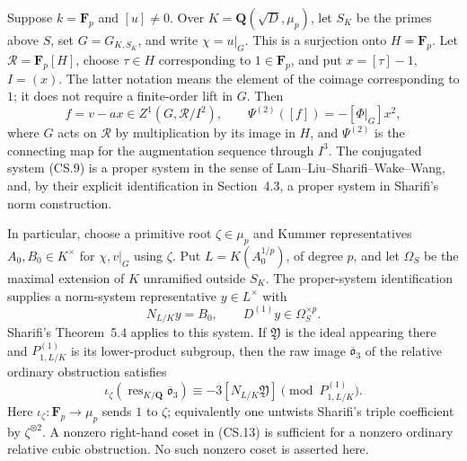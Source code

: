 \begin{corollary}
Suppose \(k=\mathbf F_p\) and \([u]\ne0\).
Over \(K=\mathbf Q(\sqrt D,\mu_p)\), let \(S_K\) be
the primes above \(S\), set \(G=G_{K,S_K}\), and write
\(\chi=u|_G\).  This is a surjection onto \(H=\mathbf F_p\).
Let \(\mathcal R=\mathbf F_p[H]\), choose \(\tau\in H\)
corresponding to \(1\in\mathbf F_p\), and put \(x=[\tau]-1\),
\(I=(x)\).  The latter notation means the element of the
coimage corresponding to \(1\); it does not require a
finite-order lift in \(G\).
Then
\[
 f=v-a x\in Z^1(G,\mathcal R/I^2),\qquad
 \Psi^{(2)}([f])=-[\Phi|_G]x^2,                       \tag{CS.11}
\]
where \(G\) acts on \(\mathcal R\) by multiplication
by its image in \(H\), and \(\Psi^{(2)}\) is the
connecting map for the augmentation sequence through
\(I^3\).  The conjugated system (CS.9) is a proper
system in the sense of Lam--Liu--Sharifi--Wake--Wang,
and, by their explicit identification in Section~4.3,
a proper system in Sharifi's norm construction.

In particular, choose a primitive root \(\zeta\in\mu_p\)
and Kummer representatives \(A_0,B_0\in K^\times\)
for \(\chi,v|_G\) using \(\zeta\).  Put
\(L=K(A_0^{1/p})\), of degree \(p\), and let
\(\Omega_S\) be the maximal extension of \(K\)
unramified outside \(S_K\).  The proper-system
identification supplies a norm-system representative
\(y\in L^\times\) with
\[
 N_{L/K}y=B_0,\qquad D^{(1)}y\in\Omega_S^{\times p}.
                                                               \tag{CS.12}
\]
Sharifi's Theorem~5.4 applies to this system.  If
\(\mathfrak Y\) is the ideal appearing there and
\(P^{(1)}_{1,L/K}\) is its lower-product subgroup,
then the raw image \(\overline{\mathfrak o}_3\) of
the relative ordinary obstruction satisfies
\[
 \iota_\zeta\!\left(\operatorname{res}_{K/\mathbf Q}
                     \overline{\mathfrak o}_3\right)
     \equiv -3[N_{L/K}\mathfrak Y]
             \pmod{P^{(1)}_{1,L/K}}.                  \tag{CS.13}
\]
Here \(\iota_\zeta:\mathbf F_p\to\mu_p\) sends
\(1\) to \(\zeta\); equivalently one untwists
Sharifi's triple coefficient by \(\zeta^{\otimes2}\).
A nonzero right-hand coset in (CS.13) is sufficient
for a nonzero ordinary relative cubic obstruction.
No such nonzero coset is asserted here.
\end{corollary}

